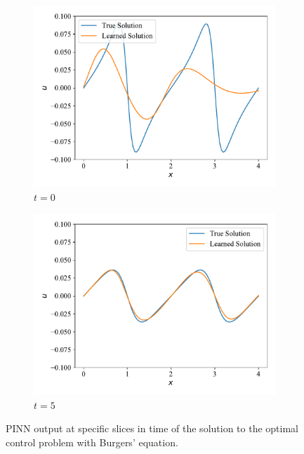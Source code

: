 \begin{figure}[H]
     \centering
     \begin{subfigure}[b]{0.45\textwidth}
         \centering
         \includegraphics[width=\textwidth]{Figures/IntermediateExperiments/OptimalControl/burger_control_slice0.pdf}
         \caption{$t = 0$}
         \label{fig:burger_control_slice0}
     \end{subfigure}
     \hfill
     \begin{subfigure}[b]{0.45\textwidth}
         \centering
         \includegraphics[width=\textwidth]{Figures/IntermediateExperiments/OptimalControl/burger_control_slice1.pdf}
         \caption{$t = 5$}
         \label{fig:burger_control_slice1}
     \end{subfigure}
    \caption{PINN output at specific slices in time of the solution to the optimal control problem with Burgers' equation.}
    \label{fig:burger_control_slices}
\end{figure}

